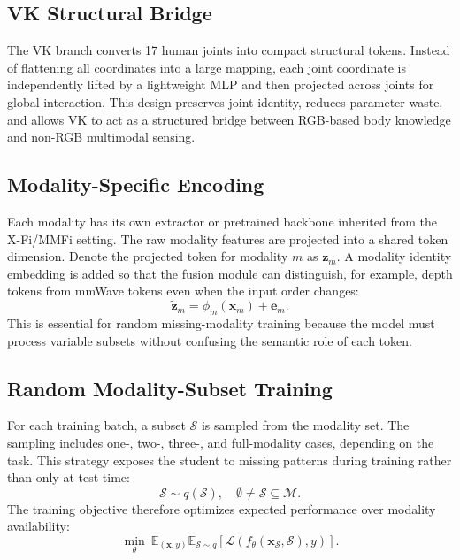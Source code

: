 \documentclass[journal]{IEEEtran}
\begin{document}
\subsection{VK Structural Bridge}

The VK branch converts 17 human joints into compact structural tokens. Instead of flattening all coordinates into a large mapping, each joint coordinate is independently lifted by a lightweight MLP and then projected across joints for global interaction. This design preserves joint identity, reduces parameter waste, and allows VK to act as a structured bridge between RGB-based body knowledge and non-RGB multimodal sensing.

\subsection{Modality-Specific Encoding}

Each modality has its own extractor or pretrained backbone inherited from the X-Fi/MMFi setting. The raw modality features are projected into a shared token dimension. Denote the projected token for modality $m$ as $\mathbf{z}_{m}$. A modality identity embedding is added so that the fusion module can distinguish, for example, depth tokens from mmWave tokens even when the input order changes:
\begin{equation}
    \tilde{\mathbf{z}}_{m} = \phi_{m}(\mathbf{x}_{m}) + \mathbf{e}_{m}.
\end{equation}
This is essential for random missing-modality training because the model must process variable subsets without confusing the semantic role of each token.

\subsection{Random Modality-Subset Training}

For each training batch, a subset $\mathcal{S}$ is sampled from the modality set. The sampling includes one-, two-, three-, and full-modality cases, depending on the task. This strategy exposes the student to missing patterns during training rather than only at test time:
\begin{equation}
    \mathcal{S}\sim q(\mathcal{S}),\quad \emptyset \neq \mathcal{S}\subseteq \mathcal{M}.
\end{equation}
The training objective therefore optimizes expected performance over modality availability:
\begin{equation}
    \min_{\theta}\ \mathbb{E}_{(\mathbf{x},y)}\mathbb{E}_{\mathcal{S}\sim q}
    \left[\mathcal{L}(f_{\theta}(\mathbf{x}_{\mathcal{S}},\mathcal{S}),y)\right].
\end{equation}
\end{document}
